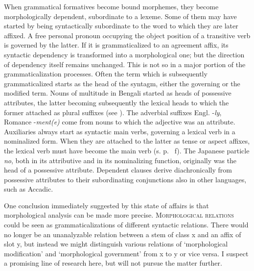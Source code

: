 When grammatical formatives become bound morphemes, they become morphologically dependent, subordinate to a lexeme. Some of them may have started by being syntactically subordinate to the word to which they are later affixed. A free personal pronoun occupying the object position of a transitive verb is governed by the latter. If it is grammaticalized to an agreement affix, its syntactic dependency is transformed into a morphological one; but the direction of dependency itself remains unchanged. This is not so in a major portion of the grammaticalization processes. Often the term which is subsequently grammaticalized starts as the head of the syntagm, either the governing or the modified term. Nouns of multitude in Bengali started as heads of possessive attributes, the latter becoming subsequently the lexical heads to which the former attached as plural suffixes (see \citealt[§2.1]{Kölver1982a}). The adverbial suffixes Engl. -\textit{ly}, Romance -\textit{ment(e)} come from nouns to which the adjective was an attribute. Auxiliaries always start as syntactic main verbs, governing a lexical verb in a nominalized form. When they are attached to the latter as tense or aspect affixes, the lexical verb must have become the main verb (s. p.~\pageref{page36}\chk%
f). The Japanese particle \textit{no}, both in its attributive and in its nominalizing function, originally was the head of a possessive attribute. Dependent clauses derive diachronically from possessive attributes to their subordinating conjunctions also in other languages, such as Accadic.

\enlargethispage{1\baselineskip}
One conclusion immediately suggested by this state of affairs is that morphological analysis can be made more precise. \textsc{Morphological relations} could be seen as grammaticalizations of different syntactic relations. There would no longer be an unanalyzable relation between a stem of class x and an affix of slot y, but instead we might distinguish various relations of ‘morphological modification’ and ‘morphological government’ from x to y or vice versa. I suspect a promising line of research here, but will not pursue the matter further.


